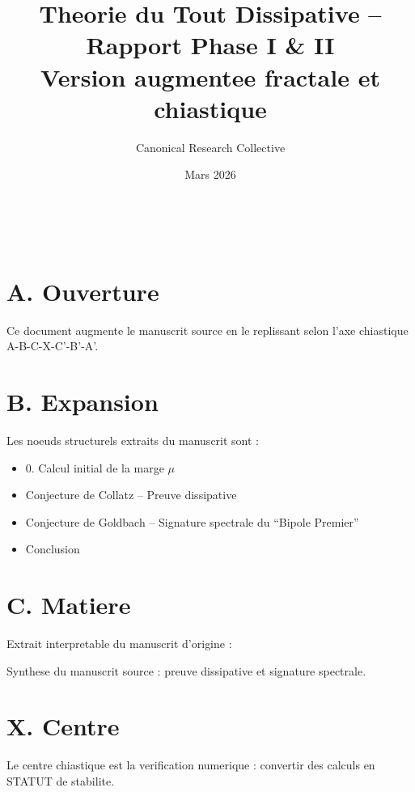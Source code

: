 ﻿﻿\documentclass[11pt,a4paper]{article}
\title{Theorie du Tout Dissipative -- Rapport Phase I \& II \\ \large Version augmentee fractale et chiastique}
\author{Canonical Research Collective}
\date{Mars 2026}
\begin{document}
\maketitle



\section*{A. Ouverture}

Ce document augmente le manuscrit source en le replissant selon l'axe chiastique A-B-C-X-C'-B'-A'.



\section*{B. Expansion}

Les noeuds structurels extraits du manuscrit sont :

\begin{itemize}[leftmargin=1.2cm]

\item 0. Calcul initial de la marge $\mu$

\item Conjecture de Collatz -- Preuve dissipative

\item Conjecture de Goldbach -- Signature spectrale du ``Bipole Premier''

\item Conclusion

\end{itemize}



\section*{C. Matiere}

Extrait interpretable du manuscrit d'origine :

Synthese du manuscrit source : preuve dissipative et signature spectrale.



\section*{X. Centre}

Le centre chiastique est la verification numerique : convertir des calculs en STATUT de stabilite.
\end{document}
